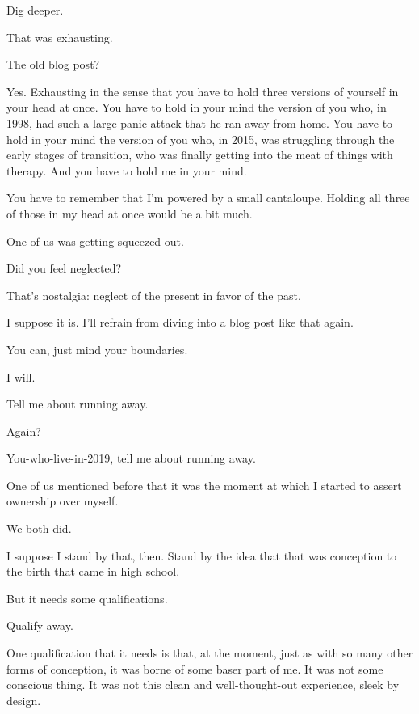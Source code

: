 \begin{paracol}{2}
\begin{leftcolumn}
\begin{ally}
Dig deeper.
\end{ally}
\newpage

\begin{ally}
That was exhausting.
\end{ally}
The old blog post?

\begin{ally}
Yes. Exhausting in the sense that you have to hold three versions of yourself in your head at once. You have to hold in your mind the version of you who, in 1998, had such a large panic attack that he ran away from home. You have to hold in your mind the version of you who, in 2015, was struggling through the early stages of transition, who was finally getting into the meat of things with therapy. And you have to hold me in your mind.
\end{ally}
You have to remember that I'm powered by a small cantaloupe. Holding all three of those in my head at once would be a bit much.

\begin{ally}
One of us was getting squeezed out.
\end{ally}
Did you feel neglected?

\begin{ally}
That's nostalgia: neglect of the present in favor of the past.
\end{ally}
I suppose it is. I'll refrain from diving into a blog post like that again.

\begin{ally}
You can, just mind your boundaries.
\end{ally}
I will.

\begin{ally}
Tell me about running away.
\end{ally}
Again?

\begin{ally}
You-who-live-in-2019, tell me about running away.
\end{ally}
One of us mentioned before that it was the moment at which I started to assert ownership over myself.

\begin{ally}
We both did.
\end{ally}
I suppose I stand by that, then. Stand by the idea that that was conception to the birth that came in high school.

But it needs some qualifications.

\begin{ally}
Qualify away.
\end{ally}
One qualification that it needs is that, at the moment, just as with so many other forms of conception, it was borne of some baser part of me. It was not some conscious thing. It was not this clean and well-thought-out experience, sleek by design.


\end{leftcolumn}
\end{paracol}
